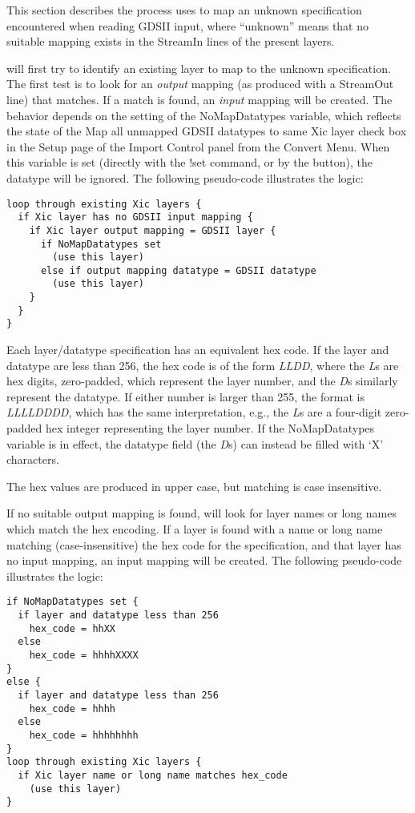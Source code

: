 This section describes the process {\Xic} uses to map an
unknown specification encountered when reading GDSII input, where
``unknown'' means that no suitable mapping exists in the
{\et StreamIn} lines of the present {\Xic} layers.

{\Xic} will first try to identify an existing {\Xic} layer to map to
the unknown specification.  The first test is to look for an {\it
output} mapping (as produced with a {\et StreamOut} line) that
matches.  If a match is found, an {\it input} mapping will be created. 
The behavior depends on the setting of the {\et NoMapDatatypes}
variable, which reflects the state of the {\cb Map all unmapped GDSII
datatypes to same Xic layer} check box in the {\cb Setup} page of the
{\cb Import Control} panel from the {\cb Convert Menu}.  When this
variable is set (directly with the {\cb !set} command, or by the
button), the datatype will be ignored.  The following pseudo-code
illustrates the logic:

\begin{verbatim}
loop through existing Xic layers {
  if Xic layer has no GDSII input mapping {
    if Xic layer output mapping = GDSII layer {
      if NoMapDatatypes set
        (use this layer)
      else if output mapping datatype = GDSII datatype
        (use this layer)
    }
  }
}
\end{verbatim}

Each layer/datatype specification has an equivalent hex code.  If the
layer and datatype are less than 256, the hex code is of the form
{\it LLDD}, where the {\it L\/}s are hex digits, zero-padded, which
represent the layer number, and the {\it D\/}s similarly represent the
datatype.  If either number is larger than 255, the format is {\it
LLLLDDDD}, which has the same interpretation, e.g., the {\it L\/}s are
a four-digit zero-padded hex integer representing the layer number. 
If the {\et NoMapDatatypes} variable is in effect, the datatype field
(the {\it D\/}s) can instead be filled with `{\vt X}' characters.

The hex values are produced in upper case, but matching is case
insensitive.

If no suitable output mapping is found, {\Xic} will look for layer
names or long names which match the hex encoding.  If a layer is found
with a name or long name matching (case-insensitive) the hex code for
the specification, and that layer has no input mapping, an input
mapping will be created.  The following pseudo-code illustrates the
logic:

\begin{verbatim}
if NoMapDatatypes set {
  if layer and datatype less than 256
    hex_code = hhXX
  else
    hex_code = hhhhXXXX
}
else {
  if layer and datatype less than 256
    hex_code = hhhh
  else
    hex_code = hhhhhhhh
}
loop through existing Xic layers {
  if Xic layer name or long name matches hex_code
    (use this layer)
}
\end{verbatim}

